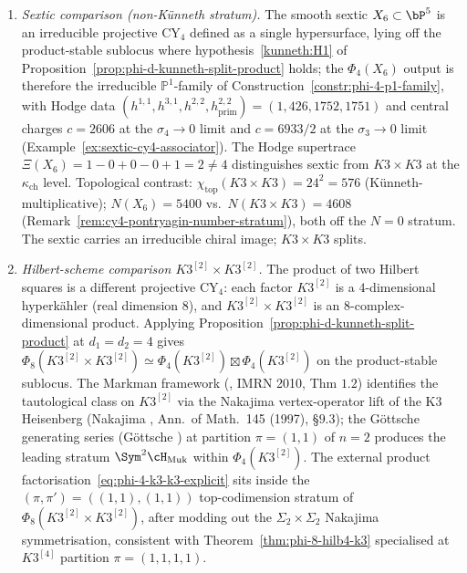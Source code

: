 \begin{remark}
\begin{enumerate}[label=\textup{(V\arabic*)}]
\item \emph{Sextic comparison \textup{(}non-K\"unneth stratum\textup{).}} The smooth sextic $X_6 \subset \bP^5$ is an irreducible projective CY$_4$ defined as a single hypersurface, lying off the product-stable sublocus where hypothesis~\ref{kunneth:H1} of Proposition~\textup{\ref{prop:phi-d-kunneth-split-product}} holds; the $\Phi_4(X_6)$ output is therefore the irreducible $\mathbb{P}^1$-family of Construction~\textup{\ref{constr:phi-4-p1-family}}, with Hodge data $(h^{1,1}, h^{3,1}, h^{2,2}, h^{2,2}_{\mathrm{prim}}) = (1, 426, 1752, 1751)$ and central charges \(c=2606\) at the \(\sigma_4\to0\) limit and \(c=6933/2\) at the \(\sigma_3\to0\) limit (Example~\textup{\ref{ex:sextic-cy4-associator}}). The Hodge supertrace $\Xi(X_6) = 1 - 0 + 0 - 0 + 1 = 2 \neq 4$ distinguishes sextic from $K3 \times K3$ at the $\kappa_{\mathrm{ch}}$ level. Topological contrast: $\chi_{\mathrm{top}}(K3 \times K3) = 24^2 = 576$ (K\"unneth-multiplicative); $N(X_6) = 5400$ vs.\ $N(K3 \times K3) = 4608$ (Remark~\textup{\ref{rem:cy4-pontryagin-number-stratum}}), both off the $N = 0$ stratum. The sextic carries an irreducible chiral image; $K3 \times K3$ splits.

\item \emph{Hilbert-scheme comparison $K3^{[2]} \times K3^{[2]}$.} The product of two Hilbert squares is a different projective CY$_4$: each factor $K3^{[2]}$ is a $4$-dimensional hyperk\"ahler (real dimension $8$), and $K3^{[2]} \times K3^{[2]}$ is an $8$-complex-dimensional product. Applying Proposition~\textup{\ref{prop:phi-d-kunneth-split-product}} at $d_1 = d_2 = 4$ gives $\Phi_8(K3^{[2]} \times K3^{[2]}) \simeq \Phi_4(K3^{[2]}) \boxtimes \Phi_4(K3^{[2]})$ on the product-stable sublocus. The Markman framework (\cite{Markman2010IMRN}, IMRN 2010, Thm $1.2$) identifies the tautological class on $K3^{[2]}$ via the Nakajima vertex-operator lift of the K3 Heisenberg (Nakajima \cite{Nakajima1999}, Ann.\ of Math.\ 145 (1997), \S$9.3$); the G\"ottsche generating series (G\"ottsche \cite{Gottsche1990}) at partition $\pi = (1,1)$ of $n = 2$ produces the leading stratum $\Sym^2 \cH_{\mathrm{Muk}}$ within $\Phi_4(K3^{[2]})$. The external product factorisation~\eqref{eq:phi-4-k3-k3-explicit} sits inside the $(\pi, \pi') = ((1,1), (1,1))$ top-codimension stratum of $\Phi_8(K3^{[2]} \times K3^{[2]})$, after modding out the $\Sigma_2 \times \Sigma_2$ Nakajima symmetrisation, consistent with Theorem~\textup{\ref{thm:phi-8-hilb4-k3}} specialised at $K3^{[4]}$ partition $\pi = (1,1,1,1)$.
\end{enumerate}


\end{remark}
